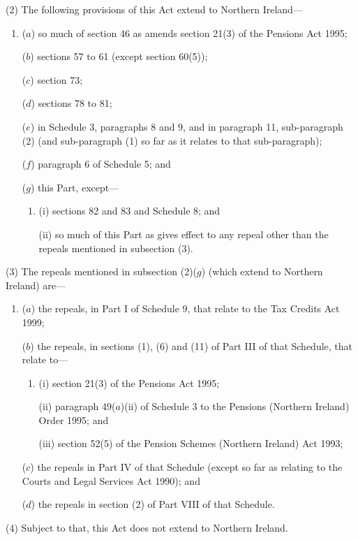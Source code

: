 \documentclass[12pt,a4paper]{article}
\begin{document}
(2) The following provisions of this Act extend to Northern Ireland—
\begin{enumerate}\item[]
($a$) so much of section 46 as amends section 21(3)  of the Pensions Act 1995;

($b$) sections 57 to 61 (except section 60(5));

($c$) section 73;

($d$) sections 78 to 81;

($e$) in Schedule 3, paragraphs 8 and 9, and in paragraph 11, sub-paragraph (2)  (and sub-paragraph (1)  so far as it relates to that sub-paragraph);

($f$) paragraph 6 of Schedule 5; and

($g$) this Part, except—
\begin{enumerate}\item[]
(i) sections 82 and 83 and Schedule 8; and

(ii) so much of this Part as gives effect to any repeal other than the repeals mentioned in subsection (3).
\end{enumerate}
\end{enumerate}

(3) The repeals mentioned in subsection (2)($g$)  (which extend to Northern Ireland) are—
\begin{enumerate}\item[]
($a$) the repeals, in Part I of Schedule 9, that relate to the Tax Credits Act 1999;

($b$) the repeals, in sections (1), (6)  and (11)  of Part III of that Schedule, that relate to—
\begin{enumerate}\item[]
(i) section 21(3)  of the Pensions Act 1995;

(ii) paragraph 49($a$)(ii)  of Schedule 3 to the Pensions (Northern Ireland) Order 1995; and

(iii) section 52(5)  of the Pension Schemes (Northern Ireland) Act 1993;
\end{enumerate}

($c$) the repeals in Part IV of that Schedule (except so far as relating to the Courts and Legal Services Act 1990); and

($d$) the repeals in section (2)  of Part VIII of that Schedule.
\end{enumerate}

(4) Subject to that, this Act does not extend to Northern Ireland.

\small
\end{document}
